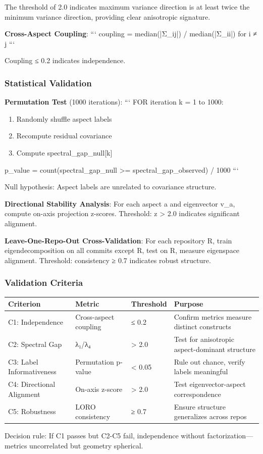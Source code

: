 The threshold of 2.0 indicates maximum variance direction is at least twice the minimum variance direction, providing clear anisotropic signature.

\textbf{Cross-Aspect Coupling}:
```
coupling = median(|Σ_ij|) / median(|Σ_ii|) for i ≠ j
```

Coupling ≤ 0.2 indicates independence.

\subsubsection{Statistical Validation}

\textbf{Permutation Test} (1000 iterations):
```
FOR iteration k = 1 to 1000:
\begin{enumerate}
\item Randomly shuffle aspect labels
\item Recompute residual covariance
\item Compute spectral_gap_null[k]
\end{enumerate}

p_value = count(spectral_gap_null >= spectral_gap_observed) / 1000
```

Null hypothesis: Aspect labels are unrelated to covariance structure.

\textbf{Directional Stability Analysis}: For each aspect a and eigenvector v_a, compute on-axis projection z-scores. Threshold: z > 2.0 indicates significant alignment.

\textbf{Leave-One-Repo-Out Cross-Validation}: For each repository R, train eigendecomposition on all commits except R, test on R, measure eigenspace alignment. Threshold: consistency ≥ 0.7 indicates robust structure.

\subsubsection{Validation Criteria}

\begin{table}[htbp]
\centering
\begin{tabular}{llll}
\toprule
Criterion & Metric & Threshold & Purpose \\
\midrule
C1: Independence & Cross-aspect coupling & ≤ 0.2 & Confirm metrics measure distinct constructs \\
C2: Spectral Gap & λ₁/λ₄ & > 2.0 & Test for anisotropic aspect-dominant structure \\
C3: Label Informativeness & Permutation p-value & < 0.05 & Rule out chance, verify labels meaningful \\
C4: Directional Alignment & On-axis z-score & > 2.0 & Test eigenvector-aspect correspondence \\
C5: Robustness & LORO consistency & ≥ 0.7 & Ensure structure generalizes across repos \\
\bottomrule
\end{tabular}
\end{table}

Decision rule: If C1 passes but C2-C5 fail, independence without factorization—metrics uncorrelated but geometry spherical.
